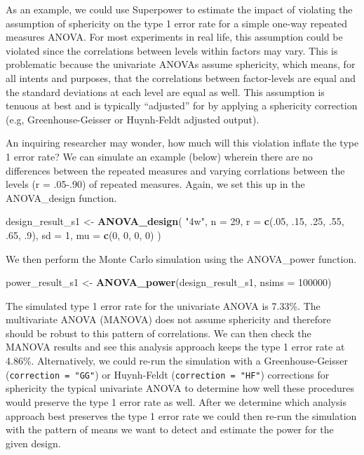 \documentclass[
  ,man,floatsintext]{apa6}
\newenvironment{Shaded}{\begin{snugshade}}{\end{snugshade}}
\newcommand{\DataTypeTok}[1]{\textcolor[rgb]{0.13,0.29,0.53}{#1}}
\newcommand{\DecValTok}[1]{\textcolor[rgb]{0.00,0.00,0.81}{#1}}
\newcommand{\FloatTok}[1]{\textcolor[rgb]{0.00,0.00,0.81}{#1}}
\newcommand{\KeywordTok}[1]{\textcolor[rgb]{0.13,0.29,0.53}{\textbf{#1}}}
\newcommand{\NormalTok}[1]{#1}
\newcommand{\StringTok}[1]{\textcolor[rgb]{0.31,0.60,0.02}{#1}}
\begin{document}
As an example, we could use Superpower to estimate the impact of violating the assumption of sphericity on the type 1 error rate for a simple one-way repeated measures ANOVA. For most experiments in real life, this assumption could be violated since the correlations between levels within factors may vary. This is problematic because the univariate ANOVAs assume sphericity, which means, for all intents and purposes, that the correlations between factor-levels are equal and the standard deviations at each level are equal as well. This assumption is tenuous at best and is typically \enquote{adjusted} for by applying a sphericity correction (e.g, Greenhouse-Geisser or Huynh-Feldt adjusted output).

An inquiring researcher may wonder, how much will this violation inflate the type 1 error rate? We can simulate an example (below) wherein there are no differences between the repeated measures and varying corrlations between the levels (r = .05-.90) of repeated measures. Again, we set this up in the ANOVA\_design function.

\begin{Shaded}
\begin{Highlighting}[]
\NormalTok{design_result_s1 <-}\StringTok{ }\KeywordTok{ANOVA_design}\NormalTok{(}
  \StringTok{"4w"}\NormalTok{,}
  \DataTypeTok{n =} \DecValTok{29}\NormalTok{,}
  \DataTypeTok{r =} \KeywordTok{c}\NormalTok{(.}\DecValTok{05}\NormalTok{, }\FloatTok{.15}\NormalTok{, }\FloatTok{.25}\NormalTok{, }\FloatTok{.55}\NormalTok{, }\FloatTok{.65}\NormalTok{, }\FloatTok{.9}\NormalTok{),}
  \DataTypeTok{sd =} \DecValTok{1}\NormalTok{,}
  \DataTypeTok{mu =} \KeywordTok{c}\NormalTok{(}\DecValTok{0}\NormalTok{, }\DecValTok{0}\NormalTok{, }\DecValTok{0}\NormalTok{, }\DecValTok{0}\NormalTok{)}
\NormalTok{)}
\end{Highlighting}
\end{Shaded}

We then perform the Monte Carlo simulation using the ANOVA\_power function.

\begin{Shaded}
\begin{Highlighting}[]
\NormalTok{power_result_s1 <-}\StringTok{ }\KeywordTok{ANOVA_power}\NormalTok{(design_result_s1, }\DataTypeTok{nsims =} \DecValTok{100000}\NormalTok{)}
\end{Highlighting}
\end{Shaded}

The simulated type 1 error rate for the univariate ANOVA is 7.33\%. The multivariate ANOVA (MANOVA) does not assume sphericity and therefore should be robust to this pattern of correlations. We can then check the MANOVA results and see this analysis approach keeps the type 1 error rate at 4.86\%. Alternatively, we could re-run the simulation with a Greenhouse-Geisser (\texttt{correction\ =\ "GG"}) or Huynh-Feldt (\texttt{correction\ =\ "HF"}) corrections for sphericity the typical univariate ANOVA to determine how well these procedures would preserve the type 1 error rate as well. After we determine which analysis approach best preserves the type 1 error rate we could then re-run the simulation with the pattern of means we want to detect and estimate the power for the given design.
\end{document}
